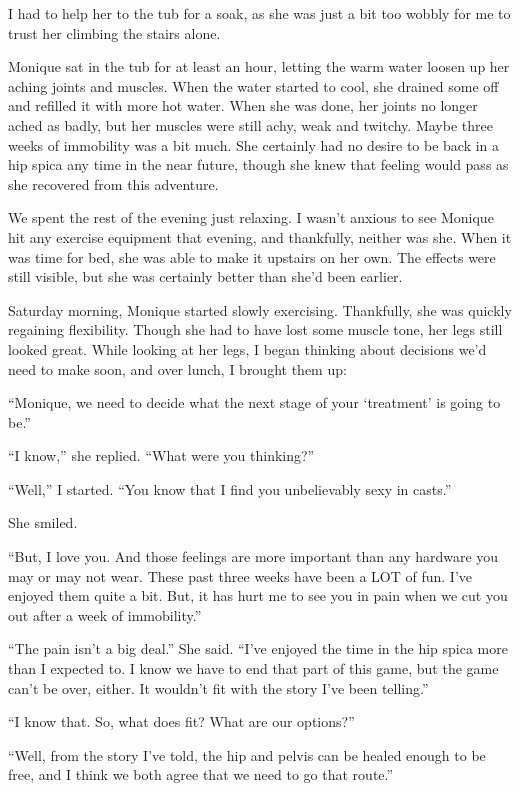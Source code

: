 I had to help her to the tub for a soak, as she was just a bit too wobbly for me to trust
her climbing the stairs alone.

Monique sat in the tub for at least an hour, letting the warm water loosen up her aching
joints and muscles. When the water started to cool, she drained some off and refilled it with
more hot water. When she was done, her joints no longer ached as badly, but her muscles were
still achy, weak and twitchy. Maybe three weeks of immobility was a bit much. She certainly had
no desire to be back in a hip spica any time in the near future, though she knew that feeling
would pass as she recovered from this adventure.

We spent the rest of the evening just relaxing. I wasn't anxious to see Monique hit any
exercise equipment that evening, and thankfully, neither was she. When it was time for bed, she
was able to make it upstairs on her own. The effects were still visible, but she was certainly
better than she'd been earlier.

Saturday morning, Monique started slowly exercising. Thankfully, she was quickly regaining
flexibility. Though she had to have lost some muscle tone, her legs still looked great. While
looking at her legs, I began thinking about decisions we'd need to make soon, and over lunch, I
brought them up:

``Monique, we need to decide what the next stage of your `treatment' is going to be.''

``I know,'' she replied. ``What were you thinking?''

``Well,'' I started. ``You know that I find you unbelievably sexy in casts.''

She smiled.

``But, I love you. And those feelings are more important than any hardware you may or may
not wear. These past three weeks have been a LOT of fun. I've enjoyed them quite a bit. But, it
has hurt me to see you in pain when we cut you out after a week of immobility.''

``The pain isn't a big deal.'' She said. ``I've enjoyed the time in the hip spica more than I
expected to. I know we have to end that part of this game, but the game can't be over, either.
It wouldn't fit with the story I've been telling.''

``I know that. So, what does fit? What are our options?''

``Well, from the story I've told, the hip and pelvis can be healed enough to be free, and I
think we both agree that we need to go that route.''

